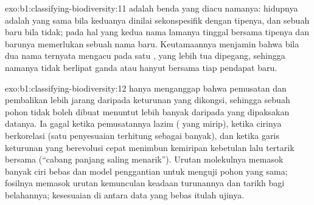 \begin{solution}{exo:b1:classifying-biodiversity:11}
 adalah benda yang diacu namanya:  hidupnya
adalah  yang sama bila keduanya dinilai sekonspesifik dengan
tipenya, dan sebuah  baru bila tidak; pada hal yang kedua nama
lamanya tinggal bersama tipenya dan  barunya memerlukan sebuah
nama baru. Keutamaannya menjamin bahwa bila dua nama ternyata mengacu
pada satu , yang lebih tua dipegang, sehingga namanya tidak
berlipat ganda atau hanyut bersama tiap pendapat baru.
\end{solution}

\begin{solution}{exo:b1:classifying-biodiversity:12}
 hanya menganggap bahwa pemusatan dan pembalikan lebih jarang
daripada keturunan yang dikongsi, sehingga sebuah pohon tidak boleh
dibuat menuntut lebih banyak daripada yang dipaksakan datanya. Ia
gagal ketika pemusatannya lazim ( yang mirip), ketika cirinya
berkorelasi (satu penyesuaian terhitung sebagai banyak), dan ketika
garis keturunan yang berevolusi cepat menimbun kemiripan kebetulan
lalu tertarik bersama (``cabang panjang saling menarik''). Urutan
molekulnya memasok banyak ciri bebas dan model penggantian untuk
menguji pohon yang sama; fosilnya memasok urutan kemunculan keadaan
turunannya dan tarikh bagi belahannya; kesesuaian di antara data yang
bebas itulah ujinya.
\end{solution}

